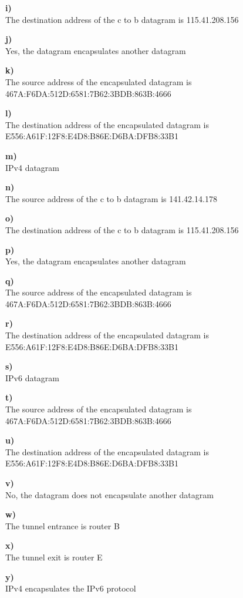 \documentclass{article}
\begin{document}
{\bf i)}\\
The destination address of the c to b datagram is 115.41.208.156

{\bf j)}\\
Yes, the datagram encapsulates another datagram

{\bf k)}\\
The source address of the encapsulated datagram is 467A:F6DA:512D:6581:7B62:3BDB:863B:4666

{\bf l)}\\
The destination address of the encapsulated datagram is E556:A61F:12F8:E4D8:B86E:D6BA:DFB8:33B1

{\bf m)}\\
IPv4 datagram

{\bf n)}\\
The source address of the c to b datagram is 141.42.14.178

{\bf o)}\\
The destination address of the c to b datagram is 115.41.208.156

{\bf p)}\\
Yes, the datagram encapsulates another datagram

{\bf q)}\\
The source address of the encapsulated datagram is 467A:F6DA:512D:6581:7B62:3BDB:863B:4666

{\bf r)}\\
The destination address of the encapsulated datagram is E556:A61F:12F8:E4D8:B86E:D6BA:DFB8:33B1

{\bf s)}\\
IPv6 datagram

{\bf t)}\\
The source address of the encapsulated datagram is 467A:F6DA:512D:6581:7B62:3BDB:863B:4666

{\bf u)}\\
The destination address of the encapsulated datagram is E556:A61F:12F8:E4D8:B86E:D6BA:DFB8:33B1

{\bf v)}\\
No, the datagram does not encapsulate another datagram

{\bf w)}\\
The tunnel entrance is router B

{\bf x)}\\
The tunnel exit is router E

{\bf y)}\\
IPv4 encapsulates the IPv6 protocol
\end{document}
